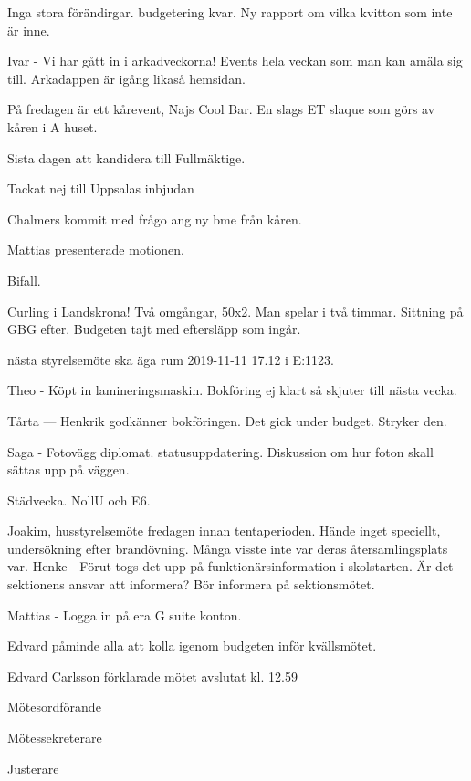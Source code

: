 \documentclass[10pt]{article}
\def\mo{Edvard Carlsson}
\def\ms{Mattias Lundström}
\def\ji{Jakob vann på sten sax påse}
\begin{document}
\begin{paragrafer}
\begin{paragrafer}


Inga stora förändirgar. budgetering kvar. Ny rapport om vilka kvitton som inte är inne. 


Ivar - Vi har gått in i arkadveckorna! Events hela veckan som man kan amäla sig till. Arkadappen är igång likaså hemsidan. 

På fredagen är ett kårevent, Najs Cool Bar. En slags ET slaque som görs av kåren i A huset. 

Sista dagen att kandidera till Fullmäktige. 

Tackat nej till Uppsalas inbjudan

Chalmers kommit med frågo ang ny bme från kåren. 


\end{paragrafer}


Mattias presenterade motionen. 

Bifall.

 
Curling i Landskrona! Två omgångar, 50x2. Man spelar i två timmar. Sittning på GBG efter. Budgeten tajt med eftersläpp som ingår. 



\Mba nästa styrelsemöte ska äga rum 2019-11-11 17.12 i E:1123.


Theo - Köpt in lamineringsmaskin. Bokföring ej klart så skjuter till nästa vecka.

Tårta --- Henkrik godkänner bokföringen. Det gick under budget. Stryker den.

Saga - Fotovägg diplomat. statusuppdatering. Diskussion om hur foton skall sättas upp på väggen. 




Städvecka. NollU och E6. 

Joakim, husstyrelsemöte fredagen innan tentaperioden. Hände inget speciellt, undersökning efter brandövning. Många visste inte var deras återsamlingsplats var. 
Henke - Förut togs det upp på funktionärsinformation i skolstarten. Är det sektionens ansvar att informera? Bör informera på sektionsmötet. 

Mattias - Logga in på era G suite konton.  

Edvard påminde alla att kolla igenom budgeten inför kvällsmötet. 



{\mo} förklarade mötet avslutat kl. 12.59
\end{paragrafer}

\hidesignfoot
\begin{signatures}{3}
\signature{\mo}{Mötesordförande}
\signature{\ms}{Mötessekreterare}
\signature{\ji}{Justerare}
\end{signatures}
\end{document}
